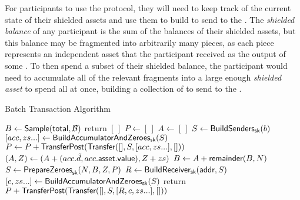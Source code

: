 
For \MantaPay{} participants to use the \Transfer{} protocol, they will need to keep track of the current state of their shielded assets and use them to build  to send to the \Ledger{}. The \emph{shielded balance} of any participant is the sum of the balances of their shielded assets, but this balance may be fragmented into arbitrarily many pieces, as each piece represents an independent asset that the participant received as the output of some \Transfer{}. To then spend a subset of their shielded balance, the participant would need to accumulate all of the relevant fragments into a large enough \emph{shielded asset} to spend all at once, building a collection of  to send to the \Ledger{}.

\begin{algorithm*}
\caption{Batch Transaction Algorithm}
\begin{algorithmic}
        \State $B \gets {\textsf{Sample}}({\textsf{total}}, \mathcal{B})$  
            \State \textsf{return} $[\,]$ 
        \EndIf
        \State $P \gets [\,]$ 
         
            \State $A \gets [\,]$
             
                \State $S \gets {\textsf{BuildSenders}}_{\textsf{sk}}(b)$
                \State $[acc, zs...] \gets {\textsf{BuildAccumulatorAndZeroes}}_{\textsf{sk}}(S)$ 
                \State $P \gets P + {\textsf{TransferPost}}({\textsf{Transfer}}([], S, [acc, zs...], []))$
                \State $(A, Z) \gets (A + (acc.\tilde{d}, acc.{\textsf{asset}}.{\textsf{value}}), Z + zs)$ 
            \EndFor
            \State $B \gets A + {\textsf{remainder}}(B, N)$
        \EndWhile
        \State $S \gets {\textsf{PrepareZeroes}}_{\textsf{sk}}(N, B, Z, P)$ 
        \State $R \gets {\textsf{BuildReceiver}}_{\textsf{sk}}({\textsf{addr}}, S)$
        \State $[c, zs...] \gets {\textsf{BuildAccumulatorAndZeroes}}_{\textsf{sk}}(S)$
        \State \textsf{return} $P + {\textsf{TransferPost}}({\textsf{Transfer}}([], S, [R, c, zs...], []))$
    \EndProcedure
\end{algorithmic}
\end{algorithm*}

